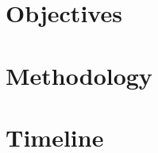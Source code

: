 \documentclass{sydeStyle}
\begin{document}

\section{Objectives}

\section{Methodology}

\section{Timeline}


\end{document}
